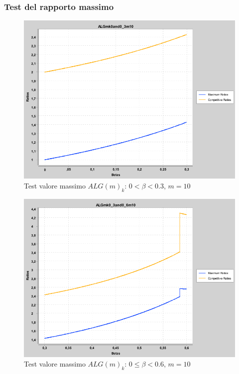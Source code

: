 \documentclass[12pt]{article}
\renewcommand{\thefigure}{\thesubsection.\arabic{figure}}
\begin{document}
\subsubsection{Test del rapporto massimo}
\setcounter{figure}{0} 
\renewcommand{\thefigure}{\thesubsection.\arabic{figure}}
\begin{figure}[H]
\caption{Test valore massimo $ALG(m)_{k}$: $0 < \beta < 0.3$, $m = 10$}
\centering
\includegraphics[scale=0.4]{max/ALGmk0and0_3m10.png}
\end{figure}
\begin{figure}[H]
\caption{Test valore massimo $ALG(m)_{k}$: $0 \leq \beta < 0.6$, $m = 10$}
\centering
\includegraphics[scale=0.4]{max/ALGmk0_3and0_6m10.png}
\end{figure}
\end{document}

